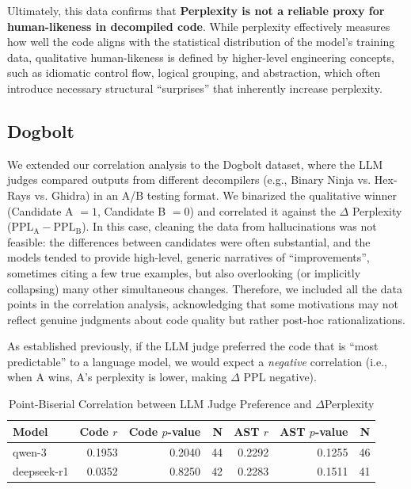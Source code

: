 Ultimately, this data confirms that \textbf{Perplexity is not a reliable proxy for human-likeness in decompiled code}. While perplexity effectively measures how well the code aligns with the statistical distribution of the model's training data, qualitative human-likeness is defined by higher-level engineering concepts, such as idiomatic control flow, logical grouping, and abstraction, which often introduce necessary structural ``surprises'' that inherently increase perplexity.

\subsection{Dogbolt}

We extended our correlation analysis to the Dogbolt dataset, where the \ac{LLM} judges compared outputs from different decompilers (e.g., Binary Ninja vs. Hex-Rays vs. Ghidra) in an A/B testing format. We binarized the qualitative winner (Candidate A $= 1$, Candidate B $= 0$) and correlated it against the $\Delta$ Perplexity ($\mathrm{PPL}_{\mathrm{A}} - \mathrm{PPL}_{\mathrm{B}}$). In this case, cleaning the data from hallucinations was not feasible: the differences between candidates were often substantial, and the models tended to provide high-level, generic narratives of ``improvements'', sometimes citing a few true examples, but also overlooking (or implicitly collapsing) many other simultaneous changes. Therefore, we included all the data points in the correlation analysis, acknowledging that some motivations may not reflect genuine judgments about code quality but rather post-hoc rationalizations.

As established previously, if the LLM judge preferred the code that is ``most predictable'' to a language model, we would expect a \textit{negative} correlation (i.e., when A wins, A's perplexity is lower, making $\Delta$ PPL negative). 

\begin{table}%
\centering
\caption{Point-Biserial Correlation between LLM Judge Preference and $\Delta$Perplexity}\label{tab:dogbolt_ppl_correlation}
\begin{tabular}{lrrrrrr}
\toprule
\textbf{Model} & \textbf{Code $r$} & \textbf{Code $p$-value} & \textbf{N} & \textbf{AST $r$} & \textbf{AST $p$-value} & \textbf{N} \\
\midrule
qwen-3 & 0.1953 & 0.2040 & 44 & 0.2292 & 0.1255 & 46 \\
deepseek-r1 & 0.0352 & 0.8250 & 42 & 0.2283 & 0.1511 & 41 \\
\bottomrule
\end{tabular}
\end{table}

